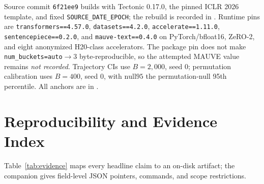 \documentclass{article}
\begin{document}
Source commit \texttt{6f21ee9} builds with Tectonic 0.17.0, the pinned ICLR
2026 template, and fixed \texttt{SOURCE\_DATE\_EPOCH}; the rebuild is recorded
in .  Runtime pins are
\texttt{transformers==4.57.0}, \texttt{datasets==4.2.0},
\texttt{accelerate==1.11.0}, \texttt{sentencepiece==0.2.0}, and
\texttt{mauve-text==0.4.0} on PyTorch/bfloat16, ZeRO-2, and eight anonymized
H20-class accelerators.  The package pin does not make
\texttt{num\_buckets=auto}$\rightarrow3$ byte-reproducible, so the attempted
MAUVE value remains \emph{not recorded}.  Trajectory CIs use $B=2{,}000$,
seed 0; permutation calibration uses $B=400$, seed 0, with
$\mathrm{null95}$ the permutation-null 95th percentile.  All anchors are in
.
\endgroup


\label{p5:main-text-end}
\begingroup
\small
\setlength{\bibsep}{1pt}

\endgroup

\appendix

\section{Reproducibility and Evidence Index}
\label{app:evidence}

Table~\ref{tab:evidence} maps every headline claim to an on-disk artifact;
the companion  gives field-level JSON
pointers, commands, and scope restrictions.
\end{document}
